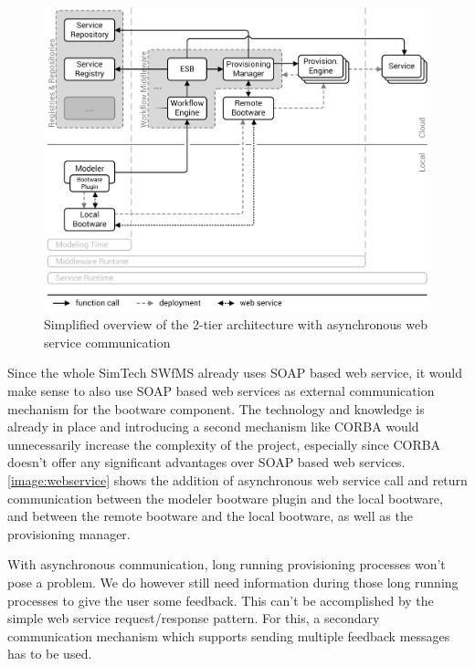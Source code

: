 \begin{figure}[!htbp]
	\centering
	\includegraphics[resolution=600]{design/assets/webservice}
	\caption{Simplified overview of the 2-tier architecture with asynchronous web service communication}
	\label{image:webservice}
\end{figure}

Since the whole SimTech SWfMS already uses SOAP based web service, it would make sense to also use SOAP based web services as external communication mechanism for the bootware component.
The technology and knowledge is already in place and introducing a second mechanism like CORBA would unnecessarily increase the complexity of the project, especially since CORBA doesn't offer any significant advantages over SOAP based web services.
\autoref{image:webservice} shows the addition of asynchronous web service call and return communication between the modeler bootware plugin and the local bootware, and between the remote bootware and the local bootware, as well as the provisioning manager.

With asynchronous communication, long running provisioning processes won't pose a problem.
We do however still need information during those long running processes to give the user some feedback.
This can't be accomplished by the simple web service request/response pattern.
For this, a secondary communication mechanism which supports sending multiple feedback messages has to be used.

